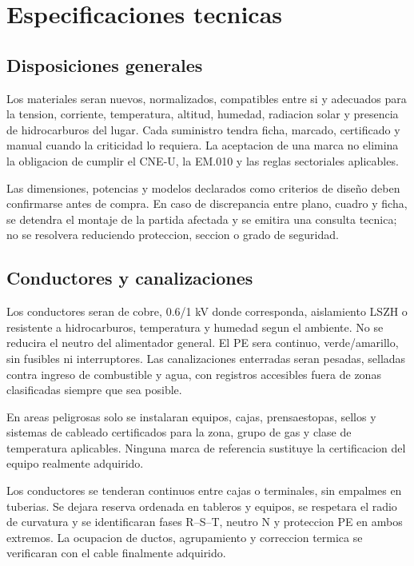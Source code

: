 \chapter{Especificaciones tecnicas}
\thispagestyle{memoria}\pagestyle{memoria}

\section{Disposiciones generales}
Los materiales seran nuevos, normalizados, compatibles entre si y adecuados para
la tension, corriente, temperatura, altitud, humedad, radiacion solar y presencia
de hidrocarburos del lugar. Cada suministro tendra ficha, marcado, certificado y
manual cuando la criticidad lo requiera. La aceptacion de una marca no elimina la
obligacion de cumplir el CNE-U, la EM.010 y las reglas sectoriales aplicables.

Las dimensiones, potencias y modelos declarados como criterios de diseño deben
confirmarse antes de compra. En caso de discrepancia entre plano, cuadro y ficha,
se detendra el montaje de la partida afectada y se emitira una consulta tecnica;
no se resolvera reduciendo proteccion, seccion o grado de seguridad.

\section{Conductores y canalizaciones}
Los conductores seran de cobre, 0.6/1 kV donde corresponda, aislamiento LSZH o resistente a hidrocarburos, temperatura y humedad segun el ambiente. No se reducira el neutro del alimentador general. El PE sera continuo, verde/amarillo, sin fusibles ni interruptores. Las canalizaciones enterradas seran pesadas, selladas contra ingreso de combustible y agua, con registros accesibles fuera de zonas clasificadas siempre que sea posible.

En areas peligrosas solo se instalaran equipos, cajas, prensaestopas, sellos y sistemas de cableado certificados para la zona, grupo de gas y clase de temperatura aplicables. Ninguna marca de referencia sustituye la certificacion del equipo realmente adquirido.

Los conductores se tenderan continuos entre cajas o terminales, sin empalmes en
tuberias. Se dejara reserva ordenada en tableros y equipos, se respetara el radio
de curvatura y se identificaran fases R--S--T, neutro N y proteccion PE en ambos
extremos. La ocupacion de ductos, agrupamiento y correccion termica se verificaran
con el cable finalmente adquirido.

